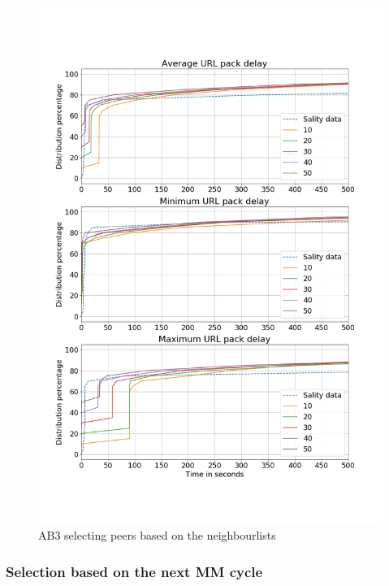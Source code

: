 \documentclass{article}
\begin{document}
\begin{figure}[H]
    \centering
    \includegraphics[width=\textwidth]{BV3-PS2.png}
    \caption{AB3 selecting peers based on the neighbourlists}
    \label{fig:AB2-PS2stats}
\end{figure}

\subsubsection*{Selection based on the next MM cycle}
\end{document}
